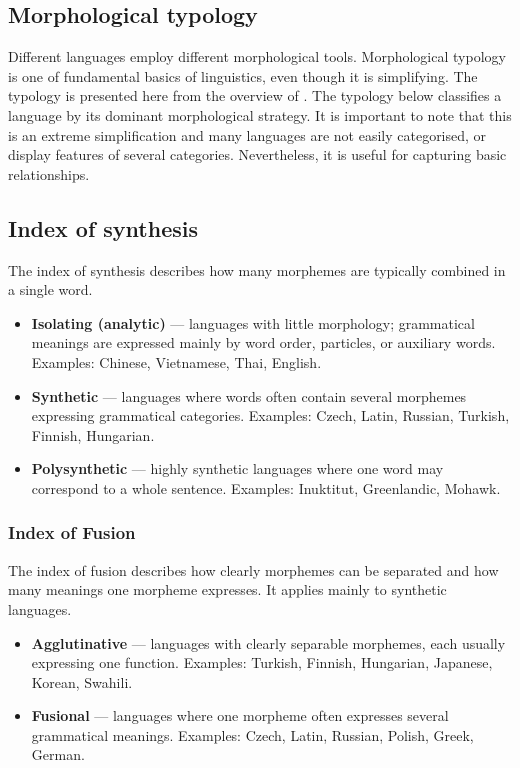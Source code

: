 \newpage

\subsection{Morphological typology}
\label{chap:typology}

Different languages employ different morphological tools. Morphological typology is one of fundamental basics of linguistics, even though it is simplifying. The typology is presented here from the overview of \textcite{Panocova2021}. The typology below classifies a language by its dominant morphological strategy. It is important to note that this is an extreme simplification and many languages are not easily categorised, or display features of several categories. Nevertheless, it is useful for capturing basic relationships.

\subsection{Index of synthesis}

The index of synthesis describes how many morphemes are typically combined in a single word.

\begin{itemize}
    \item \textbf{Isolating (analytic)} --- languages with little morphology; grammatical meanings are expressed mainly by word order, particles, or auxiliary words. Examples: Chinese, Vietnamese, Thai, English.
    
    \item \textbf{Synthetic} --- languages where words often contain several morphemes expressing grammatical categories. Examples: Czech, Latin, Russian, Turkish, Finnish, Hungarian.
    
    \item \textbf{Polysynthetic} --- highly synthetic languages where one word may correspond to a whole sentence. Examples: Inuktitut, Greenlandic, Mohawk.
\end{itemize}

\subsubsection{Index of Fusion}

The index of fusion describes how clearly morphemes can be separated and how many meanings one morpheme expresses. It applies mainly to synthetic languages.

\begin{itemize}
    \item \textbf{Agglutinative} --- languages with clearly separable morphemes, each usually expressing one function. Examples: Turkish, Finnish, Hungarian, Japanese, Korean, Swahili.
    
    \item \textbf{Fusional} --- languages where one morpheme often expresses several grammatical meanings. Examples: Czech, Latin, Russian, Polish, Greek, German.
\end{itemize}

